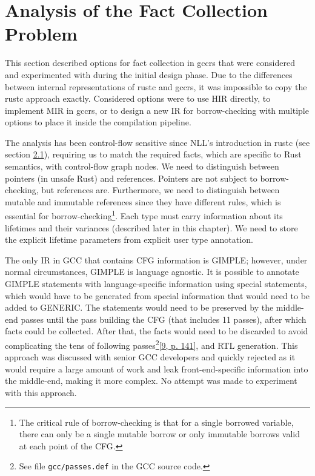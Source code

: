\documentclass[
  11pt,
  twoside,symmetric]{report}
\begin{document}
\hypertarget{analysis-of-the-fact-collection-problem}{%
\section{Analysis of the Fact Collection
Problem}\label{analysis-of-the-fact-collection-problem}}

This section described options for fact collection in gccrs that were
considered and experimented with during the initial design phase. Due to
the differences between internal representations of rustc and gccrs, it
was impossible to copy the rustc approach exactly. Considered options
were to use HIR directly, to implement MIR in gccrs, or to design a new
IR for borrow-checking with multiple options to place it inside the
compilation pipeline.

The analysis has been control-flow sensitive since NLL's introduction in
rustc (see section
\protect\hyperlink{the-evolution-of-borrow-checking-in-rustc}{2.1}),
requiring us to match the required facts, which are specific to Rust
semantics, with control-flow graph nodes. We need to distinguish between
pointers (in unsafe Rust) and references. Pointers are not subject to
borrow-checking, but references are. Furthermore, we need to distinguish
between mutable and immutable references since they have different
rules, which is essential for borrow-checking\footnote{The critical rule
  of borrow-checking is that for a single borrowed variable, there can
  only be a single mutable borrow or only immutable borrows valid at
  each point of the CFG.}. Each type must carry information about its
lifetimes and their variances (described later in this chapter). We need
to store the explicit lifetime parameters from explicit user type
annotation.

The only IR in GCC that contains CFG information is GIMPLE; however,
under normal circumstances, GIMPLE is language agnostic. It is possible
to annotate GIMPLE statements with language-specific information using
special statements, which would have to be generated from special
information that would need to be added to GENERIC. The statements would
need to be preserved by the middle-end passes until the pass building
the CFG (that includes 11 passes), after which facts could be collected.
After that, the facts would need to be discarded to avoid complicating
the tens of following
passes\footnote{See file \texttt{gcc/passes.def} in the GCC source code.}\protect\hyperlink{ref-gccint}{{[}9,
p. 141{]}}, and RTL generation. This approach was discussed with senior
GCC developers and quickly rejected as it would require a large amount
of work and leak front-end-specific information into the middle-end,
making it more complex. No attempt was made to experiment with this
approach.
\end{document}
